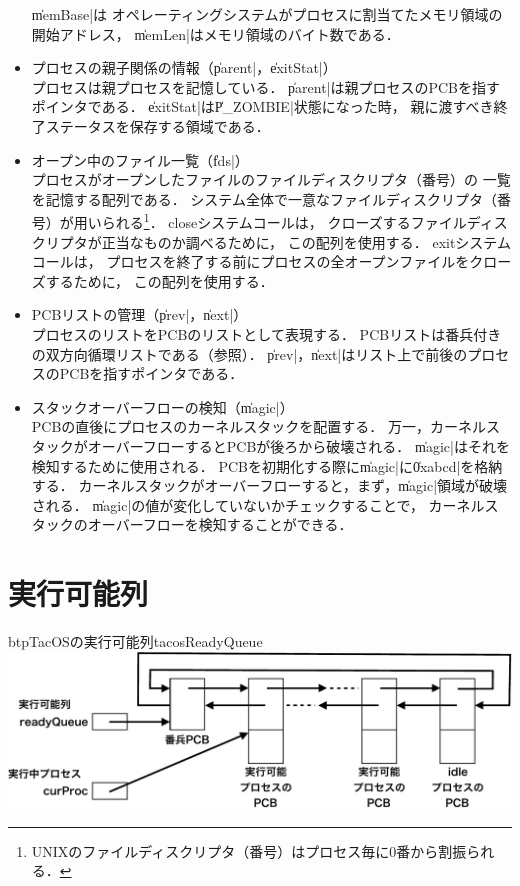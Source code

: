 \begin{itemize}
  \|memBase|は
  オペレーティングシステムがプロセスに割当てたメモリ領域の開始アドレス，
  \|memLen|はメモリ領域のバイト数である．
\item プロセスの親子関係の情報（\|parent|，\|exitStat|） \\
  プロセスは親プロセスを記憶している．
  \|parent|は親プロセスのPCBを指すポインタである．
  \|exitStat|は\|P_ZOMBIE|状態になった時，
  親に渡すべき終了ステータスを保存する領域である．
\item オープン中のファイル一覧（\|fds|） \\
  プロセスがオープンしたファイルのファイルディスクリプタ（番号）の
  一覧を記憶する配列である．
  システム全体で一意なファイルディスクリプタ（番号）が用いられる\footnote{
    UNIXのファイルディスクリプタ（番号）はプロセス毎に0番から割振られる．}．
  closeシステムコールは，
  クローズするファイルディスクリプタが正当なものか調べるために，
  この配列を使用する．
  exitシステムコールは，
  プロセスを終了する前にプロセスの全オープンファイルをクローズするために，
  この配列を使用する．
\item PCBリストの管理（\|prev|，\|next|） \\
  プロセスのリストをPCBのリストとして表現する．
  PCBリストは番兵付きの双方向循環リストである（参照）．
  \|prev|，\|next|はリスト上で前後のプロセスのPCBを指すポインタである．
\item スタックオーバーフローの検知（\|magic|） \\
  PCBの直後にプロセスのカーネルスタックを配置する．
  万一，カーネルスタックがオーバーフローするとPCBが後ろから破壊される．
  \|magic|はそれを検知するために使用される．
  PCBを初期化する際に\|magic|に\|0xabcd|を格納する．
  カーネルスタックがオーバーフローすると，まず，\|magic|領域が破壊される．
  \|magic|の値が変化していないかチェックすることで，
  カーネルスタックのオーバーフローを検知することができる．
\end{itemize}

\section{実行可能列}

\begin{myfig}{btp}{TacOSの実行可能列}{tacosReadyQueue}
  \includegraphics[scale=0.6]{Fig/tacosReadyQueue-crop.pdf}
\end{myfig}

